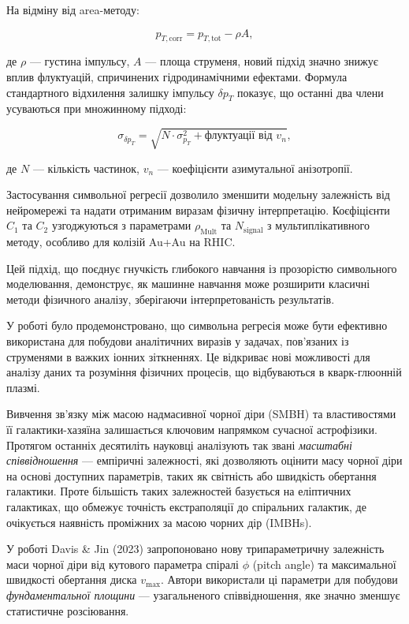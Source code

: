 \documentclass[14pt,a4paper,titlepage,oneside]{book}
\numberwithin{equation}{part}
\begin{document}
На відміну від area-методу:

\[
p_{T,\text{corr}} = p_{T,\text{tot}} - \rho A,
\]

де $\rho$ — густина імпульсу, $A$ — площа струменя, новий підхід значно знижує вплив флуктуацій, спричинених гідродинамічними ефектами. Формула стандартного відхилення залишку імпульсу $\delta p_T$ показує, що останні два члени усуваються при множинному підході:

\[
\sigma_{\delta p_T} = \sqrt{N \cdot \sigma_{p_T}^2 + \text{флуктуації від } v_n},
\]

де $N$ — кількість частинок, $v_n$ — коефіцієнти азимутальної анізотропії.

Застосування символьної регресії дозволило зменшити модельну залежність від нейромережі та надати отриманим виразам фізичну інтерпретацію. Коєфіцієнти $C_1$ та $C_2$ узгоджуються з параметрами $\rho_\text{Mult}$ та $N_\text{signal}$ з мультиплікативного методу, особливо для колізій Au+Au на RHIC.

Цей підхід, що поєднує гнучкість глибокого навчання із прозорістю символьного моделювання, демонструє, як машинне навчання може розширити класичні методи фізичного аналізу, зберігаючи інтерпретованість результатів.

У роботі було продемонстровано, що символьна регресія може бути ефективно використана для побудови аналітичних виразів у задачах, пов'язаних із струменями в важких іонних зіткненнях. Це відкриває нові можливості для аналізу даних та розуміння фізичних процесів, що відбуваються в кварк-глюонній плазмі.

Вивчення зв'язку між масою надмасивної чорної діри (SMBH) та властивостями її галактики-хазяїна залишається ключовим напрямком сучасної астрофізики. Протягом останніх десятиліть науковці аналізують так звані \textit{масштабні співвідношення} — емпіричні залежності, які дозволяють оцінити масу чорної діри на основі доступних параметрів, таких як світність або швидкість обертання галактики. Проте більшість таких залежностей базується на еліптичних галактиках, що обмежує точність екстраполяції до спіральних галактик, де очікується наявність проміжних за масою чорних дір (IMBHs).

У роботі Davis \& Jin (2023)\cite{black_hole} запропоновано нову трипараметричну залежність маси чорної діри від кутового параметра спіралі $\phi$ (pitch angle) та максимальної швидкості обертання диска $v_\text{max}$. Автори використали ці параметри для побудови \textit{фундаментальної площини} — узагальненого співвідношення, яке значно зменшує статистичне розсіювання.
\end{document}
